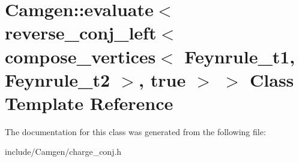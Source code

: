 \hypertarget{a00183}{}\section{Camgen\+:\+:evaluate$<$ reverse\+\_\+conj\+\_\+left$<$ compose\+\_\+vertices$<$ Feynrule\+\_\+t1, Feynrule\+\_\+t2 $>$, true $>$ $>$ Class Template Reference}
\label{a00183}


The documentation for this class was generated from the following file\+:\begin{DoxyCompactItemize}
\item 
include/\+Camgen/charge\+\_\+conj.\+h\end{DoxyCompactItemize}
